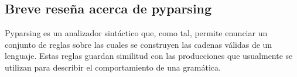 \documentclass[a4paper]{report}
\begin{document}


\subsection*{Breve reseña acerca de pyparsing}

Pyparsing es un analizador sintáctico que, como tal, permite enunciar un conjunto de reglas sobre las cuales se construyen las cadenas válidas de un lenguaje. Estas reglas guardan similitud con las producciones que usualmente se utilizan para describir el comportamiento de una gramática. 
\end{document}
